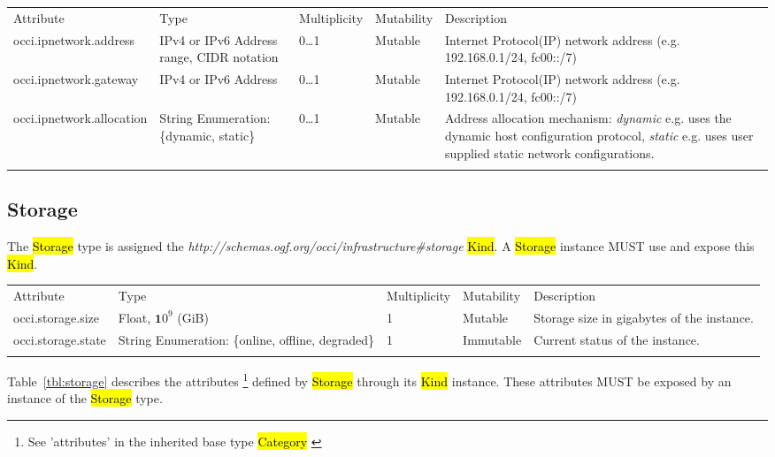 \documentclass[10pt,a4paper]{article}
\begin{document}
\begin{tabular}{lp{2.5cm}p{1cm}lp{6cm}}
\toprule
Attribute&Type&Multi\-plicity&Mutability&Description\\
\colrule
occi.ipnetwork.address & IPv4 or IPv6 Address range, CIDR notation & 0\ldots1 & Mutable & Internet Protocol(IP) network address (e.g. 192.168.0.1/24, fc00::/7)\\
occi.ipnetwork.gateway & IPv4 or IPv6 Address & 0\ldots1 & Mutable & Internet Protocol(IP) network address (e.g. 192.168.0.1/24, fc00::/7)\\
occi.ipnetwork.allocation & String Enumeration: \{dynamic, static\} & 0\ldots1 & Mutable & Address allocation mechanism: \textit{dynamic} e.g. uses the dynamic host configuration protocol, \textit{static} e.g. uses user supplied static network configurations.\\
\botrule
\end{tabular}

\subsection{Storage}
The \hl{Storage} type is assigned the \textit{http://schemas.ogf.org/occi/infrastructure\#storage} \hl{Kind}. A \hl{Storage} instance MUST use and expose this \hl{Kind}.

{
	\begin{tabular}{lp{2.5cm}p{1cm}lp{6cm}}
	\toprule
	Attribute&Type&Multi\-plicity&Mutability&Description\\
	\colrule
	\hline
	occi.storage.size & Float, ${\mathbf 10}^9$ (GiB) & 1 & Mutable 
	& Storage size in gigabytes of the 	instance.\\
	occi.storage.state & String Enumeration: \{online, offline, degraded\} & 1 & Immutable 
	& Current status of the instance.\\
	\botrule
	\end{tabular}
}
Table~\ref{tbl:storage} describes the attributes \footnote{See ’attributes’ in the inherited 
base type \hl{Category}  \cite{occi:core}} 
defined by \hl{Storage} through its \hl{Kind} instance. These attributes
MUST be exposed by an instance of the \hl{Storage} type.
\end{document}
